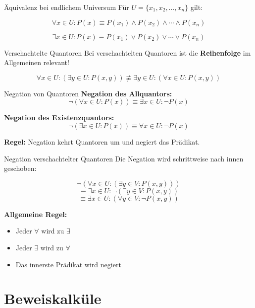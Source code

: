 \documentclass[a4paper, fontsize=7pt]{scrartcl}
\begin{document}
\begin{mainbox}{Äquivalenz bei endlichem Universum}
Für $U = \{x_1, x_2, \ldots, x_n\}$ gilt:

$$\forall x \in U: P(x) \equiv P(x_1) \land P(x_2) \land \cdots \land P(x_n)$$

$$\exists x \in U: P(x) \equiv P(x_1) \lor P(x_2) \lor \cdots \lor P(x_n)$$
\end{mainbox}

\begin{subbox}{Verschachtelte Quantoren}
Bei verschachtelten Quantoren ist die \textbf{Reihenfolge} im Allgemeinen relevant!

$$\forall x \in U: \left(\exists y \in U: P(x,y)\right) \not\equiv \exists y \in U: \left(\forall x \in U: P(x,y)\right)$$
\end{subbox}

\begin{mainbox}{Negation von Quantoren}
\textbf{Negation des Allquantors:}
$$\neg\left(\forall x \in U: P(x)\right) \equiv \exists x \in U: \neg P(x)$$

\textbf{Negation des Existenzquantors:}
$$\neg\left(\exists x \in U: P(x)\right) \equiv \forall x \in U: \neg P(x)$$

\textbf{Regel:} Negation kehrt Quantoren um und negiert das Prädikat.
\end{mainbox}

\begin{mainbox}{Negation verschachtelter Quantoren}
Die Negation wird schrittweise nach innen geschoben:

$$\neg\left(\forall x \in U: \left(\exists y \in V: P(x,y)\right)\right)$$
$$\equiv \exists x \in U: \neg\left(\exists y \in V: P(x,y)\right)$$
$$\equiv \exists x \in U: \left(\forall y \in V: \neg P(x,y)\right)$$

\textbf{Allgemeine Regel:}
\begin{itemize}
    \item Jeder $\forall$ wird zu $\exists$
    \item Jeder $\exists$ wird zu $\forall$
    \item Das innerste Prädikat wird negiert
\end{itemize}
\end{mainbox}

\section{Beweiskalküle}
\end{document}
